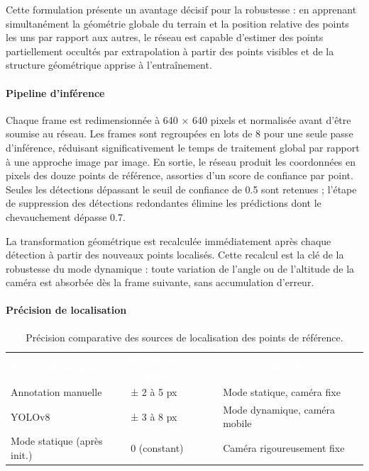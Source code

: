 Cette formulation présente un avantage décisif pour la robustesse : en apprenant simultanément la géométrie globale du terrain et la position relative des points les uns par rapport aux autres, le réseau est capable d'estimer des points partiellement occultés par extrapolation à partir des points visibles et de la structure géométrique apprise à l'entraînement.

\paragraph{Pipeline d'inférence}

Chaque frame est redimensionnée à 640 × 640 pixels et normalisée avant d'être soumise au réseau. Les frames sont regroupées en lots de 8 pour une seule passe d'inférence, réduisant significativement le temps de traitement global par rapport à une approche image par image. En sortie, le réseau produit les coordonnées en pixels des douze points de référence, assorties d'un score de confiance par point. Seules les détections dépassant le seuil de confiance de 0.5 sont retenues ; l'étape de suppression des détections redondantes élimine les prédictions dont le chevauchement dépasse 0.7.

La transformation géométrique est recalculée immédiatement après chaque détection à partir des nouveaux points localisés. Cette recalcul   est la clé de la robustesse du mode dynamique : toute variation de l'angle ou de l'altitude de la caméra est absorbée dès la frame suivante, sans accumulation d'erreur.

\paragraph{Précision de localisation}

\begin{table}[H]
  \centering
  \renewcommand{\arraystretch}{1.3}
  \begin{tabularx}{\textwidth}{X C{3.5cm} C{4cm}}
    \textcolor{white}{\textbf{Source de localisation}} &
    \textcolor{white}{\textbf{Précision typique}} &
    \textcolor{white}{\textbf{Contexte d'utilisation}} \\
    Annotation manuelle & ± 2 à 5 px & Mode statique, caméra fixe \\
    YOLOv8 & ± 3 à 8 px & Mode dynamique, caméra mobile \\
    Mode statique (après init.) & 0 (constant) & Caméra rigoureusement fixe \\
  \end{tabularx}
  \caption{Précision comparative des sources de localisation des points de référence.}
  \label{tab:precision_localisation}
\end{table}

